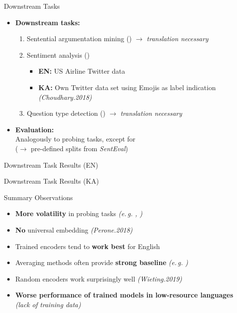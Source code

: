 \documentclass[accentcolor=tud1a,colorbacktitle,inverttitle,landscape,german,presentation,t]{tudbeamer}
\begin{document}
\begin{frame}{Downstream Tasks}{}
	\vspace*{-4mm}
	\begin{itemize}\setlength\itemsep{1em}
		\item \textbf{Downstream tasks:}
		\begin{enumerate}\setlength\itemsep{1em}
			\item Sentential argumentation mining () $\rightarrow$ \textit{translation necessary}
			\item Sentiment analysis ()
			\begin{itemize}
				\item \textbf{EN:} US Airline Twitter data
				\item \textbf{KA:} Own Twitter data set using Emojis as label indication \textit{(Choudhary.2018)}
			\end{itemize}
			\item Question type detection () $\rightarrow$ \textit{translation necessary}
		\end{enumerate}
		\item \textbf{Evaluation:} \\
			Analogously to probing tasks, except for  \\
			($\rightarrow$ pre-defined splits from \textit{SentEval})
	\end{itemize}
\end{frame}

\begin{frame}{Downstream Task Results (EN)}{}
	
\end{frame}

\begin{frame}{Downstream Task Results (KA)}{}
	
\end{frame}

\begin{frame}{Summary Observations}{}
	\vspace*{-4mm}
	\begin{itemize}\setlength\itemsep{1em}
		\item \textbf{More volatility} in probing tasks \textit{(e.\,g. , )}
		\item \textbf{No} universal embedding \textit{(Perone.2018)}
		\item Trained encoders tend to \textbf{work best} for English
		\item Averaging methods often provide \textbf{strong baseline} \textit{(e.\,g. )}
		\item Random encoders work surprisingly well \textit{(Wieting.2019)}
		\item \textbf{Worse performance of trained models in low-resource languages} \\ \textit{(lack of training data)}
	\end{itemize}
\end{frame}
\end{document}
